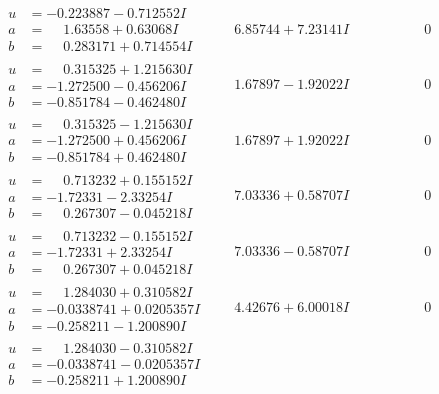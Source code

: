 \documentclass[1p]{elsarticle_modified}
\theoremstyle{definition}
\begin{document}
$$\begin{array}{c|c|c}
\begin{aligned}
u &= -0.223887 - 0.712552 I \\
a &= \phantom{-}1.63558 + 0.63068 I \\
b &= \phantom{-}0.283171 + 0.714554 I\end{aligned}
 & \phantom{-}6.85744 + 7.23141 I & \phantom{-0.000000 } 0 \\ \hline\begin{aligned}
u &= \phantom{-}0.315325 + 1.215630 I \\
a &= -1.272500 - 0.456206 I \\
b &= -0.851784 - 0.462480 I\end{aligned}
 & \phantom{-}1.67897 - 1.92022 I & \phantom{-0.000000 } 0 \\ \hline\begin{aligned}
u &= \phantom{-}0.315325 - 1.215630 I \\
a &= -1.272500 + 0.456206 I \\
b &= -0.851784 + 0.462480 I\end{aligned}
 & \phantom{-}1.67897 + 1.92022 I & \phantom{-0.000000 } 0 \\ \hline\begin{aligned}
u &= \phantom{-}0.713232 + 0.155152 I \\
a &= -1.72331 - 2.33254 I \\
b &= \phantom{-}0.267307 - 0.045218 I\end{aligned}
 & \phantom{-}7.03336 + 0.58707 I & \phantom{-0.000000 } 0 \\ \hline\begin{aligned}
u &= \phantom{-}0.713232 - 0.155152 I \\
a &= -1.72331 + 2.33254 I \\
b &= \phantom{-}0.267307 + 0.045218 I\end{aligned}
 & \phantom{-}7.03336 - 0.58707 I & \phantom{-0.000000 } 0 \\ \hline\begin{aligned}
u &= \phantom{-}1.284030 + 0.310582 I \\
a &= -0.0338741 + 0.0205357 I \\
b &= -0.258211 - 1.200890 I\end{aligned}
 & \phantom{-}4.42676 + 6.00018 I & \phantom{-0.000000 } 0 \\ \hline\begin{aligned}
u &= \phantom{-}1.284030 - 0.310582 I \\
a &= -0.0338741 - 0.0205357 I \\
b &= -0.258211 + 1.200890 I\end{aligned}

\end{array}$$
\end{document}
